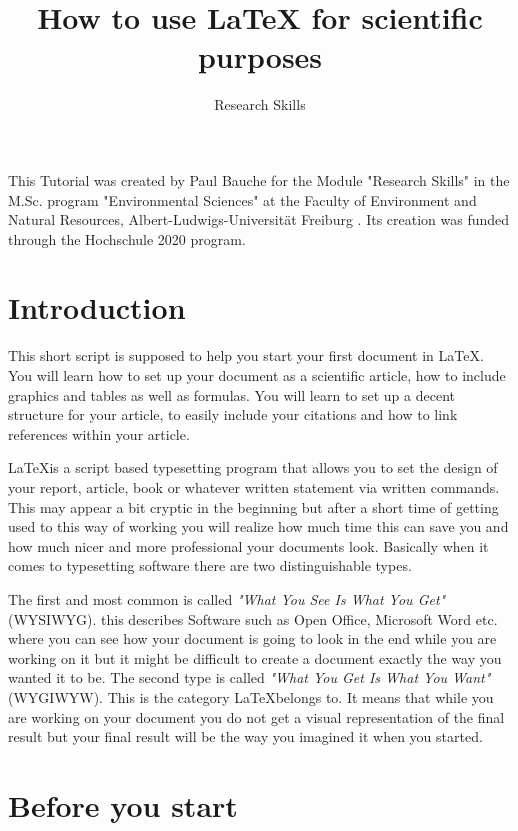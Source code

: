 \documentclass[justified]{tufte-book} %
\title{How to use LaTeX for scientific purposes}
\author{Research Skills}
\begin{document}
\let\cleardoublepage\clearpage
\maketitle
\thispagestyle{empty}
\null
\vfill
\begin{fullwidth}
\LARGE{This Tutorial was created by Paul Bauche for the Module "Research Skills" in the M.Sc. program "Environmental Sciences" at the Faculty of Environment and Natural Resources, Albert-Ludwigs-Universit\"at Freiburg . Its creation was funded through the Hochschule 2020 program.}
\end{fullwidth}
\tableofcontents

\chapter{Introduction}
\begin{fullwidth}
This short script is supposed to help you start your first document in \LaTeX. You will learn how to set up your document as a scientific article, how to include graphics and tables as well as formulas. You will learn to set up a decent structure for your article, to easily include your citations and how to link references within your article.

 \LaTeX is a script based typesetting program that allows you to set the design of your report, article, book or whatever written statement via written commands. This may appear a bit cryptic in the beginning but after a short time of getting used to this way of working you will realize how much time this can save you and how much nicer and more professional your documents look. Basically when it comes to typesetting software there are two distinguishable types.
 
The first and most common is called \emph{"What You See Is What You Get"} (WYSIWYG). this describes Software such as Open Office, Microsoft Word etc. where you can see how your document is going to look in the end while you are working on it but it might be difficult to create a document exactly the way you wanted it to be. The second type is called \emph{"What You Get Is What You Want"}(WYGIWYW). This is the category \LaTeX belongs to. It means that while you are working on your  document you do not get a visual representation of the final result but your final result will be the way you imagined it when you started.  	
\end{fullwidth}
\chapter{Before you start}
\end{document}
